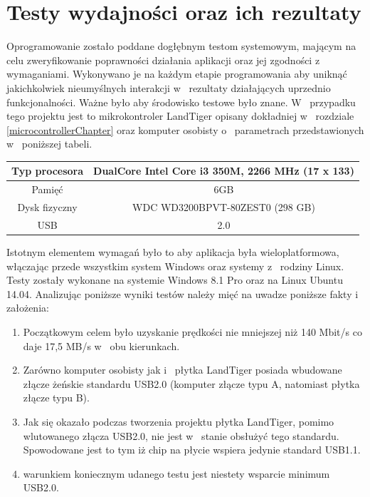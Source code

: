 \documentclass{BscUS}
\begin{document}
\chapter{Testy wydajności oraz ich rezultaty}
\label{resultsChapter}
\indent Oprogramowanie zostało poddane dogłębnym testom systemowym, mającym na celu zweryfikowanie poprawności działania aplikacji oraz jej zgodności z~ wymaganiami. Wykonywano je na każdym etapie programowania aby uniknąć jakichkolwiek nieumyślnych interakcji w~ rezultaty działających uprzednio funkcjonalności. Ważne było aby środowisko testowe było znane. W~ przypadku tego projektu jest to mikrokontroler LandTiger opisany dokładniej w~ rozdziale \ref{microcontrollerChapter} oraz komputer osobisty o~ parametrach przedstawionych w~ poniższej tabeli. %
\begin{table}[H]
\centering
\begin{tabular}{|c|c|}
\hline
	\rowcolor[gray]{0.8}
	Typ procesora & DualCore Intel Core i3 350M, 2266 MHz (17 x 133) \\ \hline
	
	Pamięć & 6GB \\ \hline
	 \rowcolor[gray]{0.8}
	 Dysk fizyczny & WDC WD3200BPVT-80ZEST0  (298 GB) \\ \hline
	USB & 2.0 \\ \hline
\end{tabular}
\captionsetup{justification=centering}
\label{tbl:pcParameters}
\end{table}
\noindent Istotnym elementem wymagań było to aby aplikacja była wieloplatformowa, włączając przede wszystkim system Windows oraz systemy z~ rodziny Linux. Testy zostały wykonane na systemie Windows 8.1 Pro oraz na Linux Ubuntu 14.04.
\noindent Analizując poniższe wyniki testów należy mięć na uwadze poniższe fakty i~ założenia:
\begin{enumerate}
\item Początkowym celem było uzyskanie prędkości nie mniejszej niż 140 Mbit/s co daje 17,5 MB/s w~ obu kierunkach.
\item Zarówno komputer osobisty jak i~ płytka LandTiger posiada wbudowane złącze żeńskie standardu USB2.0 (komputer złącze typu A, natomiast płytka złącze typu B).
\item Jak się okazało podczas tworzenia projektu płytka LandTiger, pomimo wlutowanego złącza USB2.0, nie jest w~ stanie obsłużyć tego standardu. Spowodowane jest to tym iż chip na płycie wspiera jedynie standard USB1.1.
\item warunkiem koniecznym udanego testu jest niestety wsparcie minimum USB2.0.
\end{enumerate}
\end{document}
